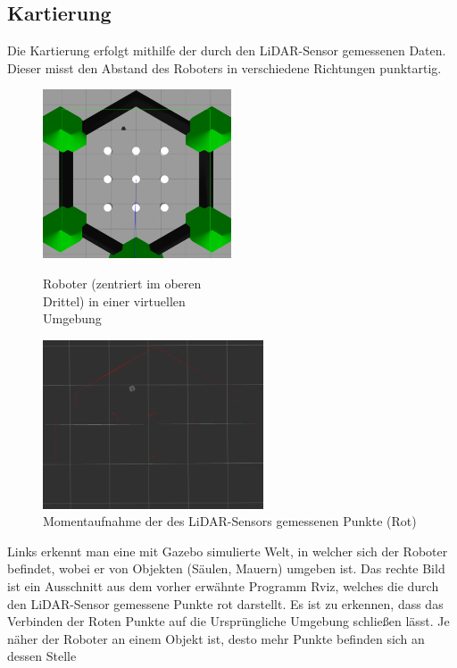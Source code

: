 {{		
	}

	\subsection{Kartierung}
	{
		Die Kartierung erfolgt mithilfe der durch den LiDAR-Sensor gemessenen Daten. Dieser misst den Abstand des Roboters in verschiedene Richtungen punktartig. \newline  
		\begin{figure}[H]
			\begin{minipage}{0.5\textwidth}
				\centering
				\includegraphics[height=5cm]{Bilder/virtualmap_world_gazebo.png}
				\caption{Roboter (zentriert im oberen \\ Drittel) in einer virtuellen \\Umgebung} %
				\label{pic:virtworldgazebo}
			\end{minipage}
			\begin{minipage}{0.5\textwidth}
				\centering
				\includegraphics[height=5cm]{Bilder/virtualmap_world_rviz.png}
				\caption{Momentaufnahme der des LiDAR-Sensors gemessenen Punkte (Rot)}
				\label{pic:virtworldlaserrviz}	
			\end{minipage}
		\end{figure}
	
		Links erkennt man eine mit Gazebo simulierte Welt, in welcher sich der Roboter befindet, wobei er von Objekten (Säulen, Mauern) umgeben ist. Das rechte Bild ist ein Ausschnitt aus dem vorher erwähnte Programm Rviz, welches die durch den LiDAR-Sensor gemessene Punkte rot darstellt. Es ist zu erkennen, dass das Verbinden der Roten Punkte auf die Ursprüngliche Umgebung schließen lässt. Je näher der Roboter an einem Objekt ist, desto mehr Punkte befinden sich an dessen Stelle
		
}}

